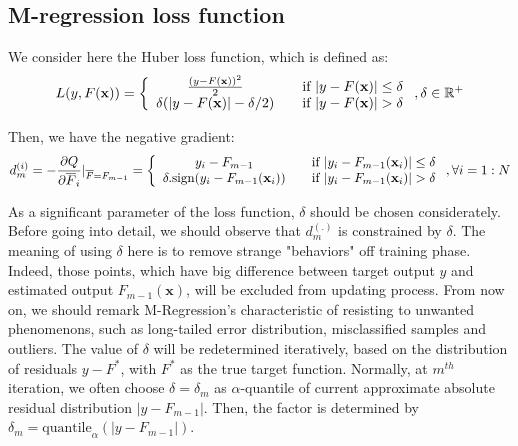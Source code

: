 \documentclass[a4paper,twoside,12pt]{article}
\begin{document}
\subsection{M-regression loss function}
\label{sec:m_treeboost}
We consider here the Huber loss function, which is defined as:
\begin{align}
	L(y, F(\textbf{x})) = \left\{
				\begin{array}{cl}
					\frac{(y-F(\textbf{x}))^2}{2} & \quad \text{if $|y-F(\textbf{x})| \leq \delta$}\\
					\delta(|y-F(\textbf{x})|-\delta/2) & \quad \text{if $|y-F(\textbf{x})| > \delta$}\\
				\end{array} 
			\right., \delta\in\mathbb{R}^{+} \notag
\end{align}

Then, we have the negative gradient:
\begin{align}
	d_m^{(i)} = -\dfrac{\partial{Q}}{\partial{\overline{F}_i}}\vert_{\overline{F} = F_{m-1}} = \left\{
		\begin{array}{cl}
			y_i-F_{m-1} & \quad \text{if $|y_i-F_{m-1}(\textbf{x}_i)| \leq \delta$}\\
			\delta.\text{sign}(y_i-F_{m-1}(\textbf{x}_i)) & \quad \text{if $|y_i-F_{m-1}(\textbf{x}_i)| > \delta$}\\
		\end{array}
		\right., \forall i = 1:N\notag
\end{align}

As a significant parameter of the loss function, $\delta$ should be chosen considerately. Before going into detail, we should observe that $d_m^{(.)}$ is constrained by $\delta$. The meaning of using $\delta$ here is to remove strange "behaviors" off training phase. Indeed, those points, which have big difference between target output $y$ and estimated output $F_{m-1}(\textbf{x})$, will be excluded from updating process. From now on, we should remark M-Regression's characteristic of resisting to unwanted phenomenons,  such as long-tailed error distribution, misclassified samples and outliers. The value of $\delta$ will be redetermined iteratively, based on the distribution of residuals $y-F^{*}$, with $F^{*}$ as the true target function. Normally, at $m^{th}$ iteration, we often choose $\delta = \delta_m$ as $\alpha$-quantile of current approximate absolute residual distribution $|y - F_{m-1}|$. Then, the factor is determined by $\delta_m = \text{quantile}_{\alpha}(|y - F_{m-1}|)$.
\end{document}
